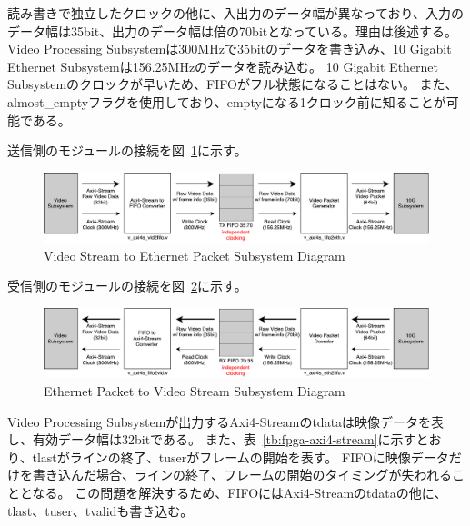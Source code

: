 読み書きで独立したクロックの他に、入出力のデータ幅が異なっており、入力のデータ幅は35bit、出力のデータ幅は倍の70bitとなっている。理由は後述する。
Video Processing Subsystemは300MHzで35bitのデータを書き込み、10 Gigabit Ethernet Subsystemは156.25MHzのデータを読み込む。
10 Gigabit Ethernet Subsystemのクロックが早いため、FIFOがフル状態になることはない。
また、almost\_emptyフラグを使用しており、emptyになる1クロック前に知ることが可能である。

送信側のモジュールの接続を図~\ref{fig:fpga-video-ethernet-diagram}に示す。

\begin{figure}[htbp]
  \begin{center}
    \includegraphics[bb=0 0 911 166,width=15.5cm]{img/fpga-video-ethernet-diagram.pdf}
  \end{center}
  \caption{Video Stream to Ethernet Packet Subsystem Diagram}
  \label{fig:fpga-video-ethernet-diagram}
\end{figure}

受信側のモジュールの接続を図~\ref{fig:fpga-ethernet-video-diagram}に示す。

\begin{figure}[htbp]
  \begin{center}
    \includegraphics[bb=0 0 911 166,width=15.5cm]{img/fpga-ethernet-video-diagram.pdf}
  \end{center}
  \caption{Ethernet Packet to Video Stream Subsystem Diagram}
  \label{fig:fpga-ethernet-video-diagram}
\end{figure}

Video Processing Subsystemが出力するAxi4-Streamのtdataは映像データを表し、有効データ幅は32bitである。
また、表~\ref{tb:fpga-axi4-stream}に示すとおり、tlastがラインの終了、tuserがフレームの開始を表す。
FIFOに映像データだけを書き込んだ場合、ラインの終了、フレームの開始のタイミングが失われることとなる。
この問題を解決するため、FIFOにはAxi4-Streamのtdataの他に、tlast、tuser、tvalidも書き込む。


